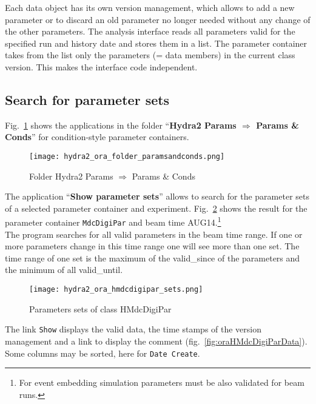 Each data object has its own version management, which allows to add a new parameter or to discard an old parameter no 
longer needed without any change of the other parameters. The analysis interface reads all parameters valid for the 
specified run and history date and stores them in a list. The parameter container takes from the list only the parameters 
(= data members) in the current class version. This makes the interface code independent.

\subsection[Search for parameter sets]{Search for parameter sets} \label{sec:oraSearchParamSets}

Fig.~\ref{fig:oraFolderParamaAndConds} shows the applications in the folder 
``\textbf{Hydra2 Params $\Rightarrow$ Params \& Conds}'' for condition-style parameter containers.

\begin{figure}[\htb]
  \centering
  \texttt{[image: hydra2\_ora\_folder\_paramsandconds.png]}
  \caption[Folder Hydra2 Params $\Rightarrow$ Params \& Conds]{Folder Hydra2 Params $\Rightarrow$ Params \& Conds}
  \label{fig:oraFolderParamaAndConds}
\end{figure}

The application ``\textbf{Show parameter sets}'' allows to search for the parameter sets of a selected parameter container  and 
experiment. Fig.~\ref{fig:oraHMdcDigiParSets} shows the result for the parameter container \verb+MdcDigiPar+ and beam time 
AUG14.\footnote{For event embedding simulation parameters must be also validated for beam runs.} \\
The program searches for all valid parameters in the beam time range. If one or more parameters change in this time range one 
will see more than one set. The time range of one set is the maximum of the valid\_since of the parameters and the minimum 
of all valid\_until.\\

\begin{figure}[\htb]
  \centering
  \texttt{[image: hydra2\_ora\_hmdcdigipar\_sets.png]}
  \caption[Parameters sets of class HMdcDigiPar]{Parameters sets of class HMdcDigiPar}
  \label{fig:oraHMdcDigiParSets}
\end{figure}

The link \verb+Show+ displays the valid data, the time stamps of the version management and a link to display the comment 
(fig.~\ref{fig:oraHMdcDigiParData}). Some columns may be sorted, here for \verb+Date Create+.

